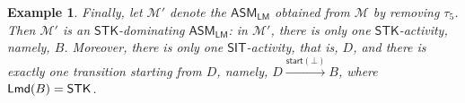 \documentclass[preprint,12pt]{elsarticle}
\newtheorem{example}{Example}
\newcommand\Mm{{\mathcal{M} }}
\newcommand\lmd{{\sf Lmd}}
\newcommand\singletask{{\sf STK}}
\newcommand{\LMAMASS}{\textsf{ASM}_\textsf{LM}}
\newcommand\startactivity{{\mathsf{start} }}
\newcommand{\STK}{\mathsf{STK}}
\newcommand{\SIT}{\mathsf{SIT}}
\newcommand{\STD}{\mathsf{STD}}
\newcommand{\STP}{\mathsf{STP}}
\begin{document}
\begin{example}
%		
 
Finally, let $\Mm'$ denote the $\LMAMASS$ obtained from $\Mm$ by removing $\tau_5$. Then $\Mm'$ is an $\STK$-dominating $\LMAMASS$: in $\Mm'$, there is only one $\STK$-activity, namely, $B$. Moreover, there is only one $\SIT$-activity, that is, $D$, and there is exactly one transition starting from $D$, namely, $D \xrightarrow{\startactivity(\bot)} B$, where $\lmd(B)= \singletask$. 
	\end{example}
	
\end{document}
